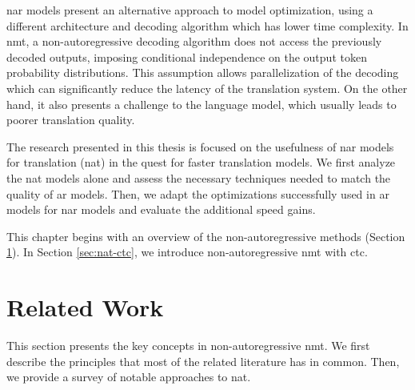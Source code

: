 \Ac{nar} models present an alternative approach to model optimization, using a
different architecture and decoding algorithm which has lower time complexity.
In \ac{nmt}, a non-autoregressive decoding algorithm does not access the
previously decoded outputs, imposing conditional independence on the output
token probability distributions. This assumption allows parallelization of the
decoding which can significantly reduce the latency of the translation
system. On the other hand, it also presents a challenge to the language model,
which usually leads to poorer translation quality.

The research presented in this thesis is focused on the usefulness of \ac{nar}
models for translation (\acs{nat}) in the quest for faster
translation models. We first analyze the \ac{nat} models alone and assess the
necessary techniques needed to match the quality of \ac{ar} models.  Then, we
adapt the optimizations successfully used in \ac{ar} models for \ac{nar} models
and evaluate the additional speed gains.

This chapter begins with an overview of the non-autoregressive methods (Section
\ref{sec:nat-methods}). In Section \ref{sec:nat-ctc}, we introduce
non-autoregressive \ac{nmt} with \ac{ctc}. 


\section{Related Work}
\label{sec:nat-methods}

This section presents the key concepts in non-autoregressive \ac{nmt}. We first
describe the principles that most of the related literature has in
common. Then, we provide a survey of notable approaches to \ac{nat}.

